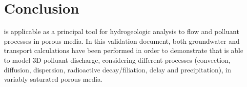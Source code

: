 \section{Conclusion}
% 
\estel is applicable as a principal tool for hydrogeologic analysis to flow and polluant processes in porous media.
% 
In this validation document, both groundwater and transport calculations have been performed in order to demonstrate that \estel is able to model 3D polluant discharge, considering different processes (convection, diffusion, dispersion, radioactive decay/filiation, delay and precipitation), in variably saturated porous media.
% 